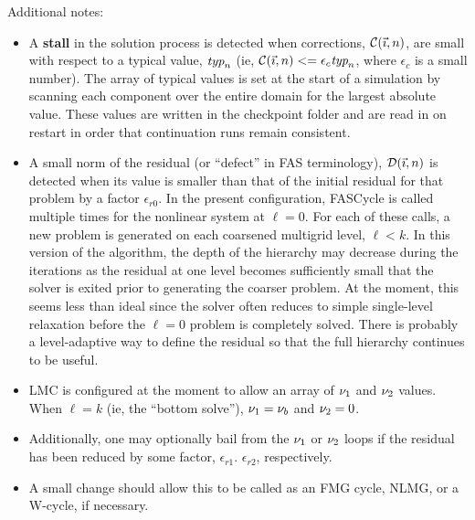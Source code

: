 \documentclass[11pt]{article}
\begin{document}
Additional notes:
\begin{itemize}
\item A {\bf stall} in the solution process is detected when
  corrections, ${\cal C}({\vec \imath},n)$, are small with respect to a typical
  value, $\mbox{\it typ}_n$ (ie, ${\cal C}({\vec \imath},n) <= \epsilon_c
  \mbox{\it typ}_n$, where $\epsilon_c$ is a small number).  The array
  of typical values is set at the start of a simulation by scanning
  each component over the entire domain for the largest absolute
  value.  These values are written in the checkpoint folder and are
  read in on restart in order that continuation runs remain
  consistent.
\item A small norm of the residual (or ``defect'' in FAS terminology),
  ${\cal D}({\vec \imath},n)$ is detected when its value is smaller than that of
  the initial residual for that problem by a factor $\epsilon_{r0}$.
  In the present configuration, {\sc FASCycle} is called multiple
  times for the nonlinear system at $\ell=0$.  For each of these
  calls, a new problem is generated on each coarsened multigrid level,
  $\ell < k$.  In this version of the algorithm, the depth of the
  hierarchy may decrease during the iterations as the residual at one
  level becomes sufficiently small that the solver is exited prior to
  generating the coarser problem.  At the moment, this seems less than
  ideal since the solver often reduces to simple single-level
  relaxation before the $\ell = 0$ problem is completely solved.
  There is probably a level-adaptive way to define the residual so
  that the full hierarchy continues to be useful.
\item LMC is configured at the moment to allow an array of ${\nu_1}$ and
  ${\nu_2}$ values.  When $\ell=k$ (ie, the ``bottom solve''), ${\nu_1} =
  \nu_b$ and ${\nu_2} = 0$.
\item Additionally, one may optionally bail from the ${\nu_1}$ or ${\nu_2}$
  loops if the residual has been reduced by some factor,
  $\epsilon_{r1}$. $\epsilon_{r2}$, respectively.
\item A small change should allow this to be called as an FMG cycle,
  NLMG, or a W-cycle, if necessary.
\end{itemize}
\end{document}
